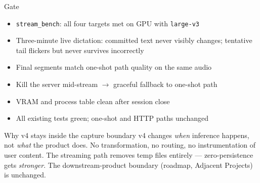 \documentclass{beamer}
\begin{document}
\begin{frame}{Gate}
    \small
    \begin{itemize}\setlength{\itemsep}{2pt}
        \item \texttt{stream\_bench}: all four targets met on GPU with
              \texttt{large-v3}
        \item Three-minute live dictation: committed text never visibly changes;
              tentative tail flickers but never survives incorrectly
        \item Final segments match one-shot path quality on the same audio
        \item Kill the server mid-stream $\rightarrow$ graceful fallback to
              one-shot path
        \item VRAM and process table clean after session close
        \item All existing tests green; one-shot and HTTP paths unchanged
    \end{itemize}

    \vspace{0.3em}
    \begin{block}{\footnotesize Why v4 stays inside the capture boundary}
        \footnotesize
        v4 changes \emph{when} inference happens, not \emph{what} the product
        does. No transformation, no routing, no instrumentation of user content.
        The streaming path removes temp files entirely --- zero-persistence gets
        \emph{stronger}. The downstream-product boundary (roadmap, Adjacent
        Projects) is unchanged.
    \end{block}
\end{frame}
\end{document}
